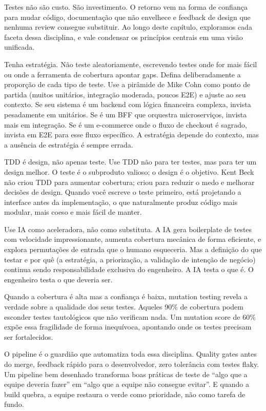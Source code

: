 Testes não são custo. São investimento. O retorno vem na forma de confiança para
mudar código, documentação que não envelhece e feedback de design que nenhuma
review consegue substituir. Ao longo deste capítulo, exploramos cada faceta
dessa disciplina, e vale condensar os princípios centrais em uma visão
unificada.

Tenha estratégia. Não teste aleatoriamente, escrevendo testes onde for mais
fácil ou onde a ferramenta de cobertura apontar gaps. Defina deliberadamente a
proporção de cada tipo de teste. Use a pirâmide de Mike Cohn como ponto de
partida (muitos unitários, integração moderada, poucos E2E) e ajuste ao
seu contexto. Se seu sistema é um backend com lógica financeira complexa,
invista pesadamente em unitários. Se é um BFF que orquestra microserviços,
invista mais em integração. Se é um e-commerce onde o fluxo de checkout é
sagrado, invista em E2E para esse fluxo específico. A estratégia depende do
contexto, mas a ausência de estratégia é sempre errada.

TDD é design, não apenas teste. Use TDD não para ter testes,
mas para ter um design melhor. O teste é o subproduto valioso; o design é o
objetivo. Kent Beck não criou TDD para aumentar cobertura; criou para reduzir o
medo e melhorar decisões de design. Quando você escreve o teste primeiro, está
projetando a interface antes da implementação, o que naturalmente produz código
mais modular, mais coeso e mais fácil de manter.

Use IA como aceleradora, não como substituta. A IA gera boilerplate de testes
com velocidade impressionante, aumenta cobertura mecânica de forma eficiente, e
explora permutações de entrada que o humano esqueceria. Mas a definição do que
testar e por quê (a estratégia, a priorização, a validação de intenção de
negócio) continua sendo responsabilidade exclusiva do engenheiro. A IA testa
o que é. O engenheiro testa o que deveria ser.

Quando a cobertura é alta mas a confiança é baixa, mutation testing revela a
verdade sobre a qualidade dos seus testes. Aqueles 90\% de cobertura podem
esconder testes tautológicos que não verificam nada. Um mutation score de 60\%
expõe essa fragilidade de forma inequívoca, apontando onde os testes
precisam ser fortalecidos.

O pipeline é o guardião que automatiza toda essa disciplina. Quality gates
antes do merge, feedback rápido para o desenvolvedor, zero tolerância com testes
flaky. Um pipeline bem desenhado transforma boas práticas de teste de ``algo que
a equipe deveria fazer'' em ``algo que a equipe não consegue evitar''. E quando a
build quebra, a equipe restaura o verde como prioridade, não como tarefa de
fundo.

